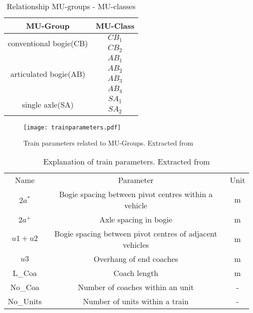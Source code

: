 \begin{appendices}
\begin{table}[h]
    \centering
    \begin{tabular}{c|c}
        \hline
        MU-Group & MU-Class\\
        \hline
        \multirow{2}{*}{conventional bogie(CB)} & $CB_1$ \\
        & $CB_2$ \\
        \hline
        \multirow{4}{*}{articulated bogie(AB)} & $AB_1$ \\
        & $AB_2$ \\
        & $AB_3$ \\
        & $AB_4$ \\
        \hline
        \multirow{2}{*}{single axle(SA)} & $SA_1$ \\
        & $SA_2$ \\
        \hline
    \end{tabular}
    \caption{Relationship MU-groups - MU-classes}
    \label{tab:MU}
\end{table} 

\begin{figure}[h]
\centering
\texttt{[image: trainparameters.pdf]}
\caption{Train parameters related to MU-Groups. Extracted from \cite[Annex C]{EC15528}}
\label{fig:trainparameters}
\end{figure}

\begin{table}[h]
    \centering
    \begin{tabular}{c|c|c}
    \hline
    Name & Parameter & Unit \\
    $2a^*$ & Bogie spacing between pivot centres within a vehicle & m \\
    $2a^+$ & Axle spacing in bogie & m \\
    $u1+u2$ & Bogie spacing between pivot centres of adjacent vehicles & m \\
    $u3$ & Overhang of end coaches & m \\
    L\_Coa & Coach length & m \\
    No\_Coa & Number of coaches within an unit & - \\
    No\_Units & Number of units within a train & - \\
    \hline
    \end{tabular}
    \caption{Explanation of train parameters. Extracted from \cite[Annex C]{EC15528}}
    \label{tab:explanationtrainparameters}
\end{table}


\end{appendices}
